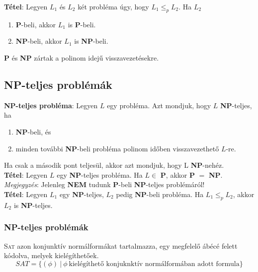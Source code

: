 \documentclass[tikz,12pt,margin=0px]{article}
\begin{document}
	\noindent \textbf{Tétel}: Legyen $L_{1}$ és $L_{2}$ két probléma úgy, hogy $L_{1} \leq_{p} L_{2}$. Ha $L_{2}$
	
	\begin{enumerate}
		\item	\textbf{P}-beli, akkor $L_{1}$ is \textbf{P}-beli.
		
		\item	\textbf{NP}-beli, akkor $L_{1}$ is \textbf{NP}-beli.
	\end{enumerate}

    \noindent \textbf{P} és \textbf{NP} zártak a polinom idejű visszavezetésekre.\\
\newpage
	\subsection*{NP-teljes problémák\\}
	
	\noindent \textbf{NP-teljes probléma}: Legyen $L$ egy probléma. Azt mondjuk, hogy $L$ \textbf{NP}-teljes, ha
	
	\begin{enumerate}
		\item	\textbf{NP}-beli, és
		\item	minden további \textbf{NP}-beli probléma polinom időben visszavezethető $L$-re.
	\end{enumerate}

    \noindent Ha csak a második pont teljesül, akkor azt mondjuk, hogy L \textbf{NP}-nehéz.\\

	\noindent \textbf{Tétel}: Legyen $L$ egy \textbf{NP}-teljes probléma. Ha $L \in$ \textbf{P}, akkor \textbf{P} $=$ \textbf{NP}.\\
	
	\noindent \emph{Megjegyzés}: Jelenleg \textbf{NEM} tudunk \textbf{P}-beli \textbf{NP}-teljes problémáról!\\
	
	\noindent \textbf{Tétel}: Legyen $L_{1}$ egy \textbf{NP}-teljes, $L_{2}$ pedig \textbf{NP}-beli probléma.
	Ha $L_{1} \leq_{p} L_{2}$, akkor $L_{2}$ is \textbf{NP}-teljes.

    \subsubsection*{NP-teljes problémák\\}

    \noindent \textsc{Sat} azon konjunktív normálformákat tartalmazza, egy megfelelő ábécé felett kódolva, melyek kielégíthetőek.
    \[
        SAT = \Big\{(\phi)\ \Big|\ \phi\ \text{kielégíthető konjuknktív normálformában adott formula} \Big\}
    \]
	
\end{document}
